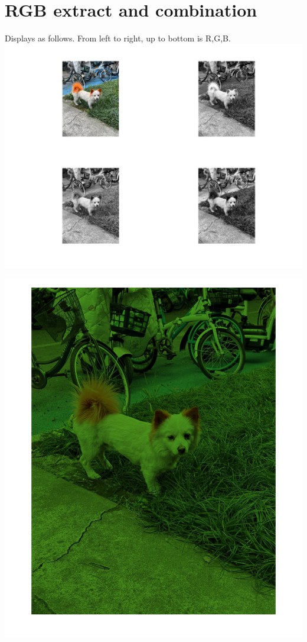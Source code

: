 \documentclass[a4paper]{article}
\begin{document}
\section{RGB extract and combination}
Displays as follows. From left to right, up to bottom is R,G,B.\\
\includegraphics[scale=0.4]{figure1.jpg}\\
\centerline{\includegraphics[scale=0.2]{figure2.jpg}}
\end{document}
